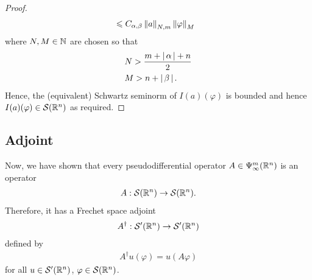 \documentclass[12pt]{article}
\begin{document}
\begin{proof}
\begin{align*}
    & \leq C_{\alpha, \beta} \norm[a]_{N,m} \norm[\varphi]_M 
    \end{align*}
    where $N, M \in \N$ are chosen so that 
    \begin{align*}
    &N > \frac{m + \abs{\alpha} + n}{2} \\
    &M > n + \abs{\beta}. 
    \end{align*}
    Hence, the (equivalent) Schwartz seminorm of $I(a)(\varphi)$ is bounded and hence $I(a)(\varphi) \in \sch(\R^n)$ as required. 
 
\end{proof}


\subsection{Adjoint} 

Now, we have shown that every pseudodifferential operator $A \in \Psi^{m}_{\infty}(\R^n)$ is an operator 
\begin{align*}
A: \sch(\R^n) \to \sch(\R^n). 
\end{align*}
Therefore, it has a Frechet space adjoint 
\begin{align*}
A^\dagger : \sch'(\R^n) \to \sch'(\R^n)
\end{align*}
defined by 
\begin{align*}
A^\dagger u(\varphi) = u(A\varphi)
\end{align*}
for all $u \in \sch'(\R^n)$, $\varphi \in \sch(\R^n)$. 
\end{document}
